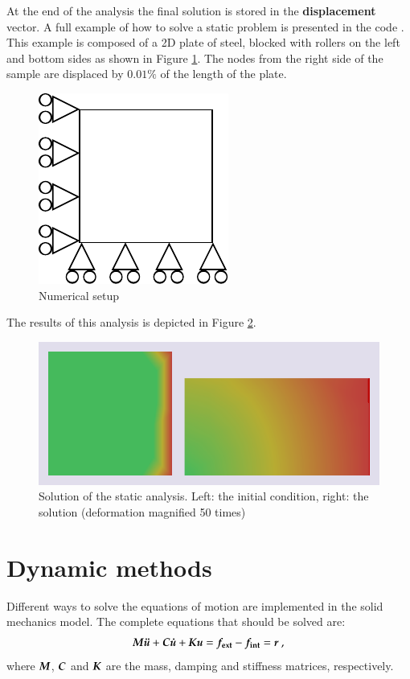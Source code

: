 At   the  end   of  the   analysis  the   final  solution   is  stored   in  the
\textbf{displacement} vector.  A  full example of how to  solve a static problem
is  presented  in   the  code  .   This
example is composed of a 2D plate of steel, blocked with rollers on the left and
bottom sides as shown in  Figure \ref{fig:smm:static}.  The nodes from the right
side of the sample are displaced by $0.01\%$ of the length of the plate.

\begin{figure}[!htb]
  \centering
  \includegraphics{figures/implicit_static}
  \caption{Numerical setup\label{fig:smm:static}}
\end{figure}

The     results     of    this     analysis     is     depicted    in     Figure
\ref{fig:smm:implicit:static_solution}.

\begin{figure}[!htb]
  \centering
  \includegraphics[width=.6\linewidth]{figures/static_analysis}
  \caption{Solution of the static  analysis. Left: the initial condition, right:
    the solution (deformation magnified 50 times)}
  \label{fig:smm:implicit:static_solution}
\end{figure}

\section{Dynamic methods} \label{sect:smm:Dynamic_methods}

Different ways  to solve  the equations  of motion are  implemented in  the solid
mechanics model.  The complete equations that should be solved are:
\begin{equation}\label{eqn:equation-motion}
  \boldsymbol{M}\boldsymbol{\ddot{u}}     +    \boldsymbol{C}\boldsymbol{\dot{u}}    +     \boldsymbol{K}\boldsymbol{u}    =
  \boldsymbol{f_{{\mathrm{ext}}}} - \boldsymbol{f_{{\mathrm{int}}}} = \boldsymbol{r}~,
\end{equation}
where $\boldsymbol{M}$,  $\boldsymbol{C}$ and  $\boldsymbol{K}$ are the  mass, damping  and stiffness
matrices, respectively.

